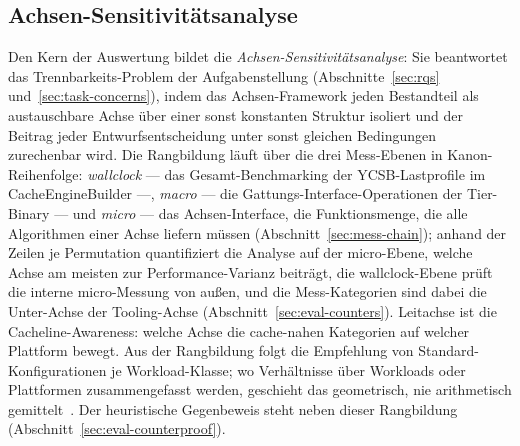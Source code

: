 \subsection{Achsen-Sensitivitätsanalyse}\label{sec:eval-sensitivity}
Den Kern der Auswertung bildet die \emph{Achsen-Sensitivitätsanalyse}: Sie beantwortet das
Trennbarkeits-Problem der Aufgabenstellung (Abschnitte~\ref{sec:rqs} und~\ref{sec:task-concerns}),
indem das Achsen-Framework jeden Bestandteil als austauschbare Achse über einer sonst konstanten
Struktur isoliert und der Beitrag jeder Entwurfsentscheidung unter sonst gleichen Bedingungen
zurechenbar wird. Die Rangbildung läuft über die drei Mess-Ebenen in Kanon-Reihenfolge:
\emph{wallclock} --- das Gesamt-Benchmarking der YCSB-Lastprofile im CacheEngineBuilder ---,
\emph{macro} --- die Gattungs-Interface-Operationen der Tier-Binary --- und \emph{micro} --- das
Achsen-Interface, die Funktionsmenge, die alle Algorithmen einer Achse liefern müssen
(Abschnitt~\ref{sec:mess-chain}); anhand der Zeilen je Permutation quantifiziert die Analyse auf der
micro-Ebene, welche Achse am meisten zur Performance-Varianz beiträgt, die wallclock-Ebene prüft die
interne micro-Messung von außen, und die Mess-Kategorien sind dabei die Unter-Achse der Tooling-Achse
(Abschnitt~\ref{sec:eval-counters}). Leitachse ist die Cacheline-Awareness: welche Achse die
cache-nahen Kategorien auf welcher Plattform bewegt. Aus der Rangbildung folgt die Empfehlung von
Standard-Konfigurationen je Workload-Klasse; wo Verhältnisse über Workloads oder Plattformen
zusammengefasst werden, geschieht das geometrisch, nie arithmetisch
gemittelt~\cite{fleming1986statistics}. Der heuristische Gegenbeweis steht neben dieser Rangbildung
(Abschnitt~\ref{sec:eval-counterproof}).


